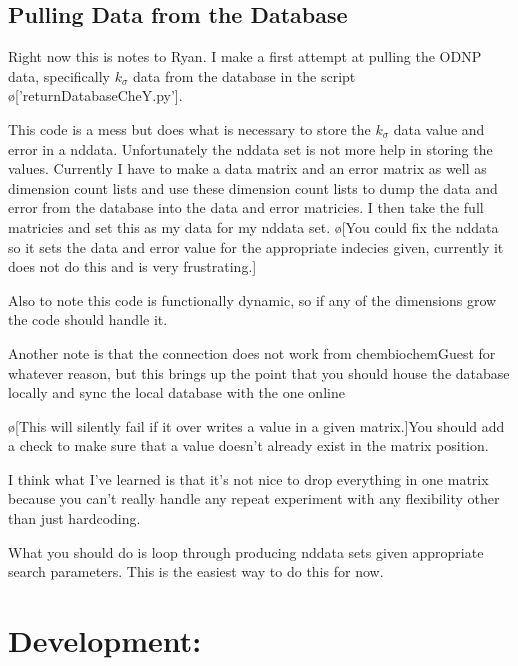 \documentclass[10pt]{book}
\begin{document}
\section{Pulling Data from the Database}

Right now this is notes to Ryan. 
I make a first attempt at pulling the ODNP data, specifically $k_{\sigma}$ data from the database in the script \o['returnDatabaseCheY.py']{}.

This code is a mess but does what is necessary to store the $k_{\sigma}$ data value and error in a nddata. Unfortunately the nddata set is not more help in storing the values. Currently I have to make a data matrix and an error matrix as well as dimension count lists and use these dimension count lists to dump the data and error from the database into the data and error matricies. I then take the full matricies and set this as my data for my nddata set. \o[You could fix the nddata so it sets the data and error value for the appropriate indecies given, currently it does not do this and is very frustrating.]{}

Also to note this code is functionally dynamic, so if any of the dimensions grow the code should handle it.

Another note is that the connection does not work from chembiochemGuest for whatever reason, but this brings up the point that you should house the database locally and sync the local database with the one online 

\o[This will silently fail if it over writes a value in a given matrix.]{You should add a check to make sure that a value doesn't already exist in the matrix position.}

I think what I've learned is that it's not nice to drop everything in one matrix because you can't really handle any repeat experiment with any flexibility other than just hardcoding.

What you should do is loop through producing nddata sets given appropriate search parameters. This is the easiest way to do this for now. 

\chapter{Development:}
\end{document}

